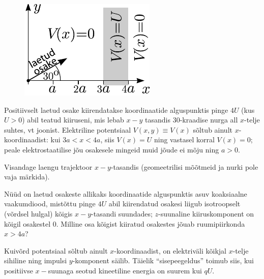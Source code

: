 
\begin{figure}%
\vspace{-10pt}
\includegraphics[width=\linewidth]{2012-v3g-09-laeng}%
\end{figure}
Positiivselt laetud osake kiirendatakse koordinaatide alguspunktis pinge $4U$ (kus $U>0$) abil teatud kiiruseni, mis
lebab $x-y$ tasandis $30$-kraadise nurga all $x$-telje suhtes, vt joonist. Elektriline potentsiaal $V(x,y)\equiv V(x)$
sõltub ainult $x$-koordinaadist: kui
$3a<x<4a$, siis $V(x)=U$ ning vastasel korral $V(x)=0$; peale elektrostaatilise jõu osakesele mingeid muid jõude ei mõju ning $a>0$.

\osa Visandage laengu trajektoor $x-y$-tasandis (geomeetrilisi mõõtmeid ja nurki pole vaja märkida).

\osa Nüüd on laetud osakeste allikaks koordinaatide alguspunktis asuv koaksiaalne vaakumdiood, mistõttu pinge $4U$
abil kiirendatud osakesi liigub isotroopselt (võrdsel hulgal) kõigis $x-y$-tasandi suundades;
$z$-suunaline kiiruskomponent on kõigil osakestel 0. Milline osa kõigist kiiratud osakestes jõuab ruumipiirkonda $x>4a$?

\hint
Kuivõrd potentsiaal sõltub ainult $x$-koordinaadist, on elektriväli kõikjal $x$-telje sihiline ning
impulsi $y$-komponent säilib. Täielik \enquote{sisepeegeldus} toimub siis, kui positiivse $x-$suunaga 
seotud kineetiline energia on suurem kui $qU$.

